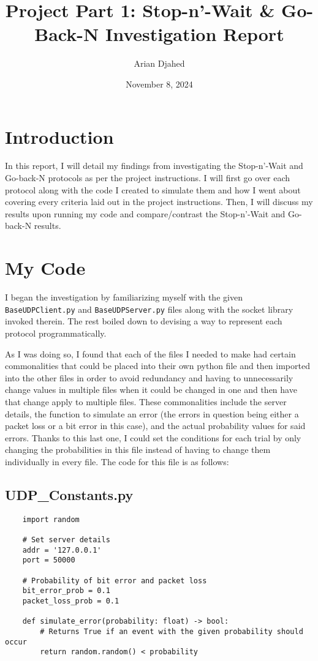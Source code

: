 \documentclass{article}
\title{Project Part 1: Stop-n'-Wait \& Go-Back-N Investigation Report}
\author{Arian Djahed}
\date{November 8, 2024}
\begin{document}
\maketitle

\section{Introduction}

In this report, I will detail my findings from investigating the Stop-n'-Wait and Go-back-N protocols as per the project instructions. I will first go over each protocol along with the code I created to simulate them and how I went about covering every criteria laid out in the project instructions. Then, I will discuss my results upon running my code and compare/contrast the Stop-n'-Wait and Go-back-N results.

\section{My Code}

I began the investigation by familiarizing myself with the given \verb|BaseUDPClient.py| and \verb|BaseUDPServer.py| files along with the socket library invoked therein. The rest boiled down to devising a way to represent each protocol programmatically.

As I was doing so, I found that each of the files I needed to make had certain commonalities that could be placed into their own python file and then imported into the other files in order to avoid redundancy and having to unnecessarily change values in multiple files when it could be changed in one and then have that change apply to multiple files. These commonalities include the server details, the function to simulate an error (the errors in question being either a packet loss or a bit error in this case), and the actual probability values for said errors. Thanks to this last one, I could set the conditions for each trial by only changing the probabilities in this file instead of having to change them individually in every file. The code for this file is as follows:

\subsection{UDP\_Constants.py}

\begin{verbatim}
    import random

    # Set server details
    addr = '127.0.0.1'
    port = 50000

    # Probability of bit error and packet loss
    bit_error_prob = 0.1
    packet_loss_prob = 0.1

    def simulate_error(probability: float) -> bool:
        # Returns True if an event with the given probability should occur
        return random.random() < probability
\end{verbatim}
\end{document}
